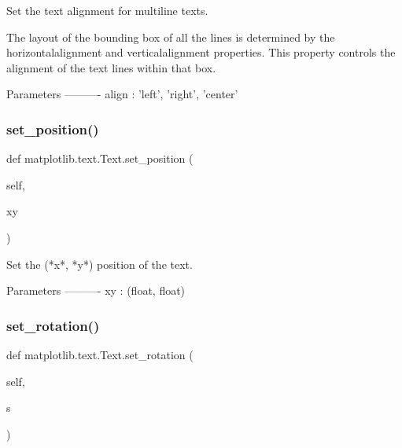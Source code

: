 \begin{DoxyVerb}Set the text alignment for multiline texts.

The layout of the bounding box of all the lines is determined by the
horizontalalignment and verticalalignment properties. This property
controls the alignment of the text lines within that box.

Parameters
----------
align : {'left', 'right', 'center'}
\end{DoxyVerb}
 \mbox{\label{classmatplotlib_1_1text_1_1Text_a9156cde9aabd06b234f07df6060b843e}} 
\subsubsection{\texorpdfstring{set\+\_\+position()}{set\_position()}}
{\footnotesize\ttfamily def matplotlib.\+text.\+Text.\+set\+\_\+position (\begin{DoxyParamCaption}\item[{}]{self,  }\item[{}]{xy }\end{DoxyParamCaption})}

\begin{DoxyVerb}Set the (*x*, *y*) position of the text.

Parameters
----------
xy : (float, float)
\end{DoxyVerb}
 \mbox{\label{classmatplotlib_1_1text_1_1Text_a7f946ecbbfdcb43690fa0922d0fcdfc1}} 
\subsubsection{\texorpdfstring{set\+\_\+rotation()}{set\_rotation()}}
{\footnotesize\ttfamily def matplotlib.\+text.\+Text.\+set\+\_\+rotation (\begin{DoxyParamCaption}\item[{}]{self,  }\item[{}]{s }\end{DoxyParamCaption})}

